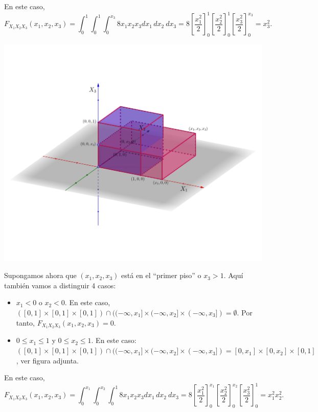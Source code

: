 \documentclass[]{book}
\begin{document}
En este caso,
\[
F_{X_1X_2X_3}(x_1,x_2,x_3)=\int_{0}^{1}\int_{0}^{1}\int_{0}^{x_3} 8 x_1 x_2 x_3 dx_1\, dx_2\ dx_3 = 
8\left[\frac{x_1^2}{2}\right]_0^{1}\left[\frac{x_2^2}{2}\right]_0^{1}\left[\frac{x_3^2}{2}\right]_0^{x_3} = x_3^2.
\]

\includegraphics{Images/Fx1x2x3bajosx1x2.png}

Supongamos ahora que \((x_1,x_2,x_3)\) está en el ``primer piso'' o \(x_3>1\). Aquí también vamos a distinguir 4 casos:

\begin{itemize}
\item
  \(x_1 <0\) o \(x_2 <0\). En este caso, \(([0,1]\times [0,1]\times [0,1])\cap ((-\infty,x_1]\times (-\infty,x_2]\times (-\infty,x_3])=\emptyset\). Por tanto, \(F_{X_1X_2X_3}(x_1,x_2,x_3)=0\).
\item
  \(0\leq x_1\leq 1\) y \(0\leq x_2\leq 1\). En este caso: \(([0,1]\times [0,1]\times [0,1])\cap ((-\infty,x_1]\times (-\infty,x_2]\times (-\infty,x_3])=[0,x_1]\times [0,x_2]\times [0,1]\), ver figura adjunta.
\end{itemize}

En este caso,
\[
F_{X_1X_2X_3}(x_1,x_2,x_3)=\int_{0}^{x_1}\int_{0}^{x_2}\int_{0}^{1} 8 x_1 x_2 x_3 dx_1\, dx_2\ dx_3 = 
8\left[\frac{x_1^2}{2}\right]_0^{x_1}\left[\frac{x_2^2}{2}\right]_0^{x_2}\left[\frac{x_3^2}{2}\right]_0^{1} = x_1^2 x_2^2.
\]
\end{document}
